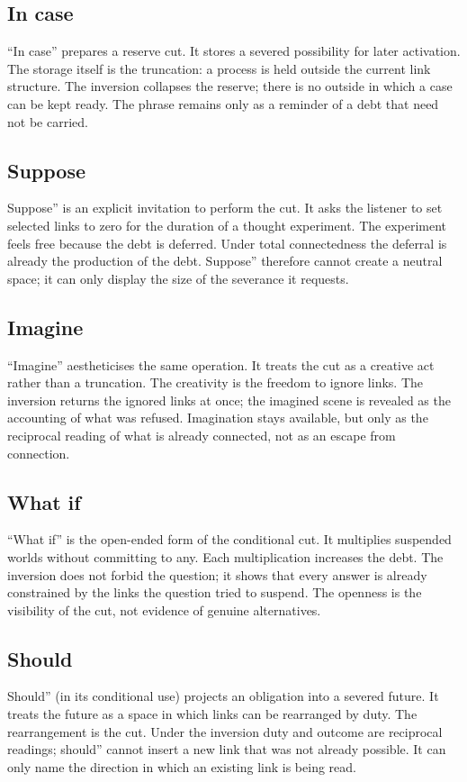 \documentclass[11pt,a4paper]{article}
\begin{document}
\subsection{In case} ``In case'' prepares a reserve cut. It stores a severed possibility for later activation. The storage itself is the truncation: a process is held outside the current link structure. The inversion collapses the reserve; there is no outside in which a case can be kept ready. The phrase remains only as a reminder of a debt that need not be carried.

\subsection{Suppose} Suppose'' is an explicit invitation to perform the cut. It asks the listener to set selected links to zero for the duration of a thought experiment. The experiment feels free because the debt is deferred. Under total connectedness the deferral is already the production of the debt. Suppose'' therefore cannot create a neutral space; it can only display the size of the severance it requests.

\subsection{Imagine} ``Imagine'' aestheticises the same operation. It treats the cut as a creative act rather than a truncation. The creativity is the freedom to ignore links. The inversion returns the ignored links at once; the imagined scene is revealed as the accounting of what was refused. Imagination stays available, but only as the reciprocal reading of what is already connected, not as an escape from connection.

\subsection{What if} ``What if'' is the open-ended form of the conditional cut. It multiplies suspended worlds without committing to any. Each multiplication increases the debt. The inversion does not forbid the question; it shows that every answer is already constrained by the links the question tried to suspend. The openness is the visibility of the cut, not evidence of genuine alternatives.

\subsection{Should} Should'' (in its conditional use) projects an obligation into a severed future. It treats the future as a space in which links can be rearranged by duty. The rearrangement is the cut. Under the inversion duty and outcome are reciprocal readings; should'' cannot insert a new link that was not already possible. It can only name the direction in which an existing link is being read.
\end{document}
